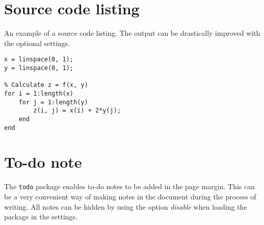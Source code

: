 \section{Source code listing}
An example of a source code listing. The output can be drastically improved
with the optional settings. \lstset{language=Matlab}
\begin{lstlisting}[frame=single]
% Generate x- and y-nodes
x = linspace(0, 1);
y = linspace(0, 1);

% Calculate z = f(x, y)
for i = 1:length(x)
    for j = 1:length(y)
        z(i, j) = x(i) + 2*y(j);
    end
end
\end{lstlisting}

\section{To-do note}
The \texttt{todo} package enables to-do notes to be added in the page margin.
This can be a very convenient way of making notes in the document during the
process of writing. All notes can be hidden by using the option \emph{disable}
when loading the package in the settings. 